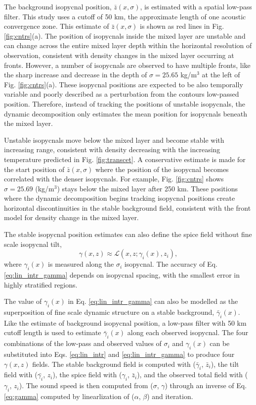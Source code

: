 \documentclass[preprint,NumberedRefs]{JASA}
\begin{document}
The background isopycnal position, $\bar{z}(x, \sigma)$, is estimated with a spatial low-pass filter. This study uses a cutoff of 50 km, the approximate length of one acoustic convergence zone\cite{jensen2011computational}. This estimate of $\bar{z}(x, \sigma)$ is shown as red lines in Fig. \ref{fig:cntrs}(a). The position of isopycnals inside the mixed layer are unstable and can change across the entire mixed layer depth within the horizontal resolution of observation, consistent with density changes in the mixed layer occurring at fronts. However, a number of isopycnals are observed to have multiple fronts, like the sharp increase and decrease in the depth of $\sigma=25.65$ kg/m$^3$ at the left of Fig. \ref{fig:cntrs}(a). These isopycnal positions are expected to be also temporally variable and poorly described as a perturbation from the contours low-passed position. Therefore, instead of tracking the positions of unstable isopycnals, the dynamic decomposition only estimates the mean position for isopycnals beneath the mixed layer.

Unstable isopycnals move below the mixed layer and become stable with increasing range, consistent with density decreasing with the increasing temperature predicted in Fig. \ref{fig:transcet}. A conservative estimate is made for the start position of $\bar{z}(x, \sigma)$ where the position of the isopycnal becomes correlated with the denser isopycnals. For example, Fig. \ref{fig:cntrs} shows $\sigma=25.69$ (kg/m$^3$) stays below the mixed layer after 250 km. These positions where the dynamic decomposition begins tracking isopycnal positions create horizontal discontinuities in the stable background field, consistent with the front model for density change in the mixed layer.

The stable isopycnal position estimates can also define the spice field without fine scale isopycnal tilt,
\begin{equation}
    \gamma(x, z)\approx\mathcal{L}(x, z; \gamma_i(x), z_i),
    \label{eq:lin_intr_gamma}
\end{equation}
where $\gamma_i(x)$ is measured along the $\sigma_i$ isopycnal. The accuracy of Eq. \eqref{eq:lin_intr_gamma} depends on isopycnal spacing, with the smallest error in highly stratified regions.

The value of $\gamma_i(x)$ in Eq. \eqref{eq:lin_intr_gamma} can also be modelled as the superposition of fine scale dynamic structure on a stable background, $\bar{\gamma}_i(x)$. Like the estimate of background isopycnal position, a low-pass filter with 50 km cutoff length is used to estimate $\bar{\gamma}_i(x)$ along each observed isopycnal. The four combinations of the low-pass and observed values of $\sigma_i$ and $\gamma_i(x)$ can be substituted into Eqs. \eqref{eq:lin_intr} and \eqref{eq:lin_intr_gamma} to produce four $\gamma(x,z)$ fields. The stable background field is computed with ($\bar{\gamma}_i$, $\bar{z}_i$), the tilt field with ($\bar{\gamma_i}$, $z_i$), the spice field with ($\gamma_i$, $\bar{z}_i$), and the observed total field with ($\gamma_i$, $z_i$). The sound speed is then computed from ($\sigma$, $\gamma$) through an inverse of Eq. \eqref{eq:gamma} computed by linearlization of ($\alpha$, $\beta$) and iteration.
\end{document}
